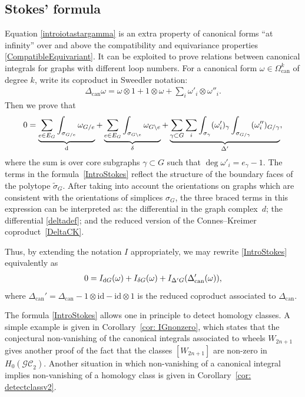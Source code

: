 \documentclass[pdftex]{sigma}%
\numberwithin{equation}{section}
\newcommand{\GC}{\mathcal{GC}}
\newcommand{\id}{\mathrm{id}}
\newcommand{\can}{\mathrm{can}}
\newcommand{\0}{\color{blue}{\mathsf{0}}}
\begin{document}
\subsection{Stokes' formula}
 Equation \eqref{introiotastargamma} is an extra property of canonical forms ``at infinity'' over and above the compatibility and equivariance properties \eqref{CompatibleEquivariant}. It can be exploited to prove relations between canonical integrals for graphs with different loop numbers.
 For a canonical form $\omega \in \Omega^k_{\can}$ of degree $k$, write its coproduct in Sweedler notation:
\begin{gather*}
\Delta_{\can} \omega = \omega\otimes 1 + 1 \otimes \omega + \sum_i \omega'_i \otimes \omega''_i.
\end{gather*}
Then we prove that
\begin{gather} \label{IntroStokes}
0 = \underbrace{ \sum_{e\in E_G} \int_{\sigma_{G/e}} \omega_{G/e} }_{\rm d} + \underbrace{ \sum_{e\in E_G} \int_{\sigma_{G\backslash e}} \omega_{G\backslash e} }_{\delta} + \underbrace{\sum_{\gamma\subset G} \sum_i \int_{\sigma_{\gamma}} (\omega'_i)_{\gamma} \int_{\sigma_{G/\gamma}} (\omega''_i)_{G/\gamma} }_{\Delta'},
\end{gather}
where the sum is over core subgraphs $\gamma \subset G$ such that $\deg \omega'_i = e_{\gamma}-1$. The terms in the formula~\eqref{IntroStokes} reflect the structure of the boundary faces of the polytope $\widetilde{\sigma}_G$.
After taking into account the orientations on graphs which are consistent with the orientations of simplices $\sigma_G$, the three braced terms in this expression can be interpreted as: the differential in the graph complex~$d$; the differential \eqref{deltadef}; and the reduced version of the Connes--Kreimer coproduct~\eqref{DeltaCK}.

Thus, by extending the notation $I$ appropriately, we may rewrite \eqref{IntroStokes} equivalently as
\begin{gather*}
 0 = I_{{\rm d}G}(\omega) + I_{\delta G} (\omega) + I_{\Delta' G} (\Delta_{\can}'(\omega)),
 \end{gather*}
where $\Delta_{\can}'=\Delta_{\can} - 1 \otimes \id - \id \otimes 1$ is the reduced coproduct associated to $\Delta_{\can}$.

\begin{rem}The formula \eqref{IntroStokes} allows one in principle to detect homology classes.
A simple example is given in Corollary~\ref{cor: IGnonzero}, which states that the conjectural non-vanishing of the canonical integrals associated to wheels $W_{2n+1}$ gives another proof of the fact that the classes $[W_{2n+1}]$ are non-zero in $H_0(\GC_2)$.
Another situation in which non-vanishing of a canonical integral implies non-vanishing of a homology class is given in Corollary~\ref{cor: detectclassv2}.
\end{rem}
\end{document}
